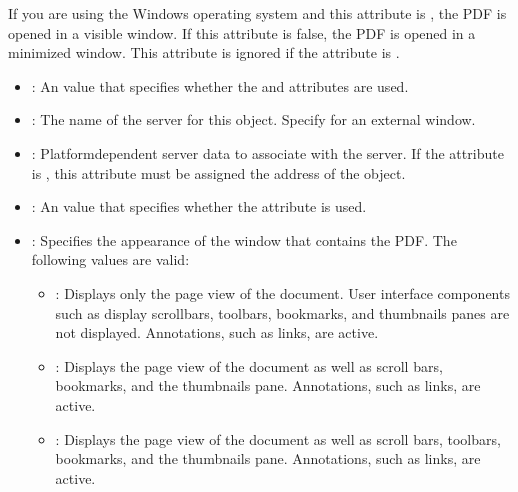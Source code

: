 \documentclass[letterpaper,12pt,english,openany,oneside]{sphinxmanual}
\begin{document}
If you are using the Windows operating system and this attribute is , the PDF is opened in a visible window. If this attribute is false, the PDF is opened in a minimized window. This attribute is ignored if the  attribute is .
\begin{itemize}
\item {} 
: An  value that specifies whether the  and  attributes are used.

\item {} 
: The name of the  server for this  object. Specify  for an external window.

\item {} 
: Platform\sphinxhyphen{}dependent server data to associate with the  server. If the  attribute is , this attribute must be assigned the address of the  object.

\item {} 
: An  value that specifies whether the  attribute is used.

\item {} 
: Specifies the appearance of the window that contains the PDF. The following values are valid:
\begin{itemize}
\item {} 
: Displays only the page view of the document. User interface components such as display scrollbars, toolbars, bookmarks, and thumbnails panes are not displayed. Annotations, such as links, are active.

\item {} 
: Displays the page view of the document as well as scroll bars, bookmarks, and the thumbnails pane. Annotations, such as links, are active.

\item {} 
: Displays the page view of the document as well as scroll bars, toolbars, bookmarks, and the thumbnails pane. Annotations, such as links, are active.


\end{itemize}
\end{itemize}
\end{document}
